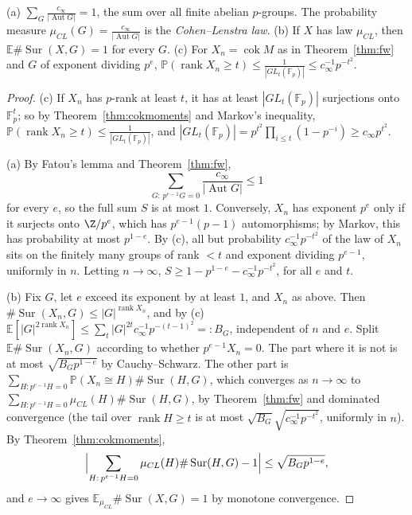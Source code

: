 \begin{corollary}\label{cor:clmeasure}
(a) $\sum_G\frac{c_\infty}{|\operatorname{Aut}G|}=1$, the sum over all finite abelian $p$-groups. The probability measure $\mu_{CL}(G)=\frac{c_\infty}{|\operatorname{Aut}G|}$ is the \emph{Cohen--Lenstra law}.
(b) If $X$ has law $\mu_{CL}$, then $\mathbb E\#\operatorname{Sur}(X,G)=1$ for every $G$.
(c) For $X_n=\operatorname{cok}M$ as in Theorem~\ref{thm:fw} and $G$ of exponent dividing $p^e$, $\mathbb P(\operatorname{rank}X_n\ge t)\le\frac1{|GL_t(\mathbb F_p)|}\le c_\infty^{-1}p^{-t^2}$.
\end{corollary}
\begin{proof}
(c) If $X_n$ has $p$-rank at least $t$, it has at least $|GL_t(\mathbb F_p)|$ surjections onto $\mathbb F_p^t$; so by Theorem~\ref{thm:cokmoments} and Markov's inequality, $\mathbb P(\operatorname{rank}X_n\ge t)\le\frac1{|GL_t(\mathbb F_p)|}$, and $|GL_t(\mathbb F_p)|=p^{t^2}\prod_{i\le t}(1-p^{-i})\ge c_\infty p^{t^2}$.

(a) By Fatou's lemma and Theorem~\ref{thm:fw},\[\sum_{G:\,p^{e-1}G=0}\frac{c_\infty}{|\operatorname{Aut}G|}\le1\]for every $e$, so the full sum $S$ is at most $1$. Conversely, $X_n$ has exponent $p^e$ only if it surjects onto $\Z/p^e$, which has $p^{e-1}(p-1)$ automorphisms; by Markov, this has probability at most $p^{1-e}$. By (c), all but probability $c_\infty^{-1}p^{-t^2}$ of the law of $X_n$ sits on the finitely many groups of rank $<t$ and exponent dividing $p^{e-1}$, uniformly in $n$. Letting $n\to\infty$, $S\ge1-p^{1-e}-c_\infty^{-1}p^{-t^2}$, for all $e$ and $t$.

(b) Fix $G$, let $e$ exceed its exponent by at least $1$, and $X_n$ as above. Then $\#\operatorname{Sur}(X_n,G)\le|G|^{\operatorname{rank}X_n}$, and by (c) $\mathbb E[|G|^{2\operatorname{rank}X_n}]\le\sum_t|G|^{2t}c_\infty^{-1}p^{-(t-1)^2}=:B_G$, independent of $n$ and $e$. Split $\mathbb E\#\operatorname{Sur}(X_n,G)$ according to whether $p^{e-1}X_n=0$. The part where it is not is at most $\sqrt{B_Gp^{1-e}}$ by Cauchy--Schwarz. The other part is $\sum_{H:p^{e-1}H=0}\mathbb P(X_n\cong H)\#\operatorname{Sur}(H,G)$, which converges as $n\to\infty$ to $\sum_{H:p^{e-1}H=0}\mu_{CL}(H)\#\operatorname{Sur}(H,G)$, by Theorem~\ref{thm:fw} and dominated convergence (the tail over $\operatorname{rank}H\ge t$ is at most $\sqrt{B_G}\sqrt{c_\infty^{-1}p^{-t^2}}$, uniformly in $n$). By Theorem~\ref{thm:cokmoments},\[\Bigl|\sum_{H:\,p^{e-1}H=0}\mu_{CL}(H)\#\operatorname{Sur}(H,G)-1\Bigr|\le\sqrt{B_Gp^{1-e}},\]and $e\to\infty$ gives $\mathbb E_{\mu_{CL}}\#\operatorname{Sur}(X,G)=1$ by monotone convergence.
\end{proof}

